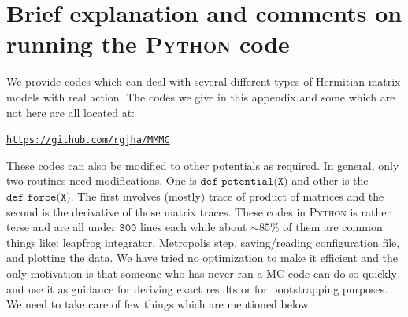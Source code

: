 \documentclass[11pt]{article}
\newcommand{\PY}{\textsc{Python }}
\begin{document}

\section{Brief explanation and comments on 
running the \PY code}

We provide codes which can deal with several different types of 
Hermitian matrix models with real action. The codes we give 
in this appendix and some which are not here are all located at:  
\begin{center} \texttt{\href{https://github.com/rgjha/MMMC}{https://github.com/rgjha/MMMC}} \end{center}
These codes can also be modified to other potentials as required.
In general, only two routines need modifications. 
One is $\texttt{def potential(X)}$ and 
other is the $\texttt{def force(X)}$. The first involves (mostly) 
trace of product of matrices and the second is the derivative of those matrix traces. 
These codes in \PY is rather terse
and are all under $\texttt{300}$ lines each
while about $\sim 85\%$ of them are common things like:
leapfrog integrator, Metropolis step, saving/reading configuration file, 
and plotting the data. We have tried no optimization to make it efficient and the
only motivation is that someone who has never ran a MC code can do
so quickly and use it as guidance for deriving exact results or for
bootstrapping purposes. We need to take care of few things which are 
mentioned below.  
\end{document}
